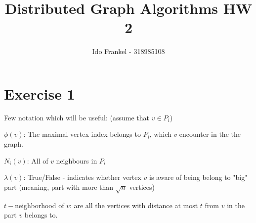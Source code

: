 \documentclass[11pt]{article}
\begin{document}
\author{Ido Frankel - 318985108}
\title{Distributed Graph Algorithms HW 2}
\maketitle

\medskip


\section{Exercise 1}
Few notation which will be useful: (assume that $v \in P_i$)

$\phi(v)$: The maximal vertex index belongs to $P_i$, which $v$ encounter in the the graph.

$N_i(v)$: All of $v$ neighbours in $P_i$

$\lambda(v)$: True/False - indicates whether vertex $v$ is aware of being belong to "big" part (meaning, part with more than $\sqrt{n}$ vertices)

$t-$neighborhood of $v$: are all the vertices with distance at most $t$ from $v$ in the part $v$ belongs to.
\end{document}
